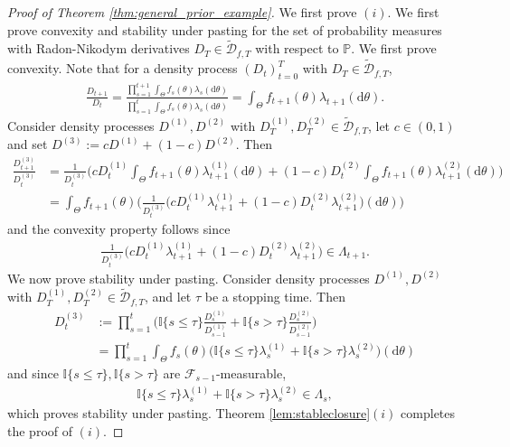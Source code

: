 \documentclass[11pt,a4paper]{article}
\renewcommand{\P}{\mathbb{P}}
\newcommand{\calF}{\mathcal{F}}
\newcommand{\calD}{\mathcal{D}}
\newcommand{\rmd}{\mathrm{d}}
\newcommand{\indic}{\mathbb{I}}
\begin{document}
\begin{proof}[Proof of Theorem \ref{thm:general_prior_example}]
We first prove $(i)$. We first prove convexity and stability under pasting for the set of probability measures with Radon-Nikodym derivatives $D_T\in \widetilde{\calD}_{f,T}$ with respect to $\P$. 
We first prove convexity. 
Note that for a density process $(D_t)_{t=0}^T$ with $D_T\in\widetilde{\calD}_{f,T}$, 
\begin{align*}
\frac{D_{t+1}}{D_t}=\frac{\prod_{s=1}^{t+1}\int_{\Theta}f_s(\theta)\lambda_s(\rmd \theta)}{\prod_{s=1}^{t}\int_{\Theta}f_s(\theta)\lambda_s(\rmd \theta)}
=\int_{\Theta}f_{t+1}(\theta)\lambda_{t+1}(\rmd \theta).
\end{align*}
Consider density processes 
$D^{(1)},D^{(2)}$ with $D^{(1)}_T,D^{(2)}_T\in \widetilde{\calD}_{f,T}$, let $c\in (0,1)$ and set $D^{(3)}:= cD^{(1)}+(1-c)D^{(2)}$.
Then 
\begin{align*}
\frac{D^{(3)}_{t+1}}{D^{(3)}_t}
&=\frac{1}{D^{(3)}_t}\Big(cD^{(1)}_{t} \int_{\Theta}f_{t+1}(\theta)\lambda^{(1)}_{t+1}(\rmd \theta)+(1-c)D^{(2)}_{t} \int_{\Theta}f_{t+1}(\theta)\lambda^{(2)}_{t+1}(\rmd \theta)\Big)\\
&=\int_{\Theta}f_{t+1}(\theta)\bigg(\frac{1}{D^{(3)}_t}\Big(cD^{(1)}_t\lambda^{(1)}_{t+1}+(1-c)D^{(2)}_t\lambda^{(2)}_{t+1}\Big)(\rmd \theta)\bigg)
\end{align*}
and the convexity property follows since 
\begin{align*}
\frac{1}{D^{(3)}_{t}}\Big(cD^{(1)}_{t}\lambda^{(1)}_{t+1}+(1-c)D^{(2)}_{t}\lambda^{(2)}_{t+1}\Big)\in \Lambda_{t+1}.
\end{align*}
We now prove stability under pasting. 
Consider density processes 
$D^{(1)},D^{(2)}$ with $D^{(1)}_T,D^{(2)}_T\in \widetilde{\calD}_{f,T}$, and let $\tau$ be a stopping time. Then 
\begin{align*}
D^{(3)}_t&:=\prod_{s=1}^t\bigg(\indic\{s\leq \tau\}\frac{D^{(1)}_s}{D^{(1)}_{s-1}}+\indic\{s> \tau\}\frac{D^{(2)}_s}{D^{(2)}_{s-1}}\bigg)\\
&=\prod_{s=1}^t \int_{\Theta}f_s(\theta)\Big(\indic\{s\leq \tau\}\lambda^{(1)}_s+\indic\{s> \tau\}\lambda^{(2)}_s\Big)(\rmd \theta)
\end{align*}
and since $\indic\{s\leq \tau\},\indic\{s> \tau\}$ are $\calF_{s-1}$-measurable, 
\begin{align*}
\indic\{s\leq \tau\}\lambda^{(1)}_s+\indic\{s>\tau\}\lambda^{(2)}_s \in \Lambda_s,
\end{align*}
which proves stability under pasting. Theorem \ref{lem:stableclosure}$(i)$ completes the proof of $(i)$. 


\end{proof}
\end{document}
